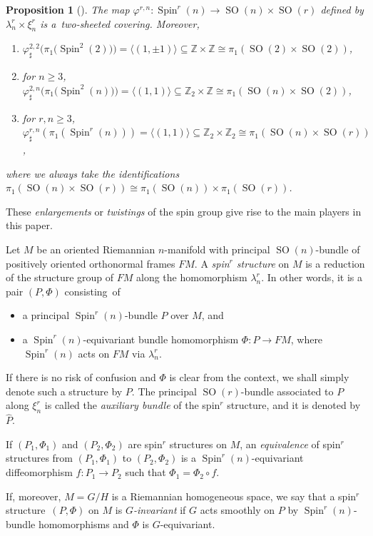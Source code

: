 \documentclass[pdftex]{sigma}
\numberwithin{equation}{section}
\newtheorem{Proposition}[Theorem]{Proposition}
{ \theoremstyle{definition}
	\newtheorem{Definition}[Theorem]{Definition}
	\newtheorem{Note}[Theorem]{Note}
	\newtheorem{Example}[Theorem]{Example}
	\newtheorem{Remark}[Theorem]{Remark} }
\DeclareMathOperator{\SO}{SO}
\DeclareMathOperator{\Spin}{Spin}
\begin{document}
		\begin{Proposition}[\cite{gen_spin_AL}]\label{prop:fg}
			The map $\varphi^{r,n} \colon \Spin^r(n) \to \SO(n) \times \SO(r)$ defined by $\lambda^{r}_n \times \xi^{r}_n$ is a~two-sheeted covering. Moreover,
			\begin{enumerate}\itemsep=0pt
				\item[$(1)$] $\varphi^{2,2}_{\sharp}\bigl(\pi_1\bigl( \Spin^2(2)\bigr) \bigr) = \langle(1,\pm 1)\rangle \subseteq \mathbb{Z} \times \mathbb{Z} \cong \pi_1 ( \SO(2) \times \SO(2))$,
				\item[$(2)$] for $n \geq 3$, $\varphi^{2,n}_{\sharp} \bigl( \pi_1 \bigl(\Spin^2(n)\bigr)\bigr) = \langle(1,1)\rangle \subseteq \mathbb{Z}_2 \times \mathbb{Z} \cong \pi_1 ( \SO(n) \times \SO(2))$,
				\item[$(3)$] for $r,n \geq 3$, $\varphi^{r,n}_{\sharp}(\pi_1 (\Spin^r(n) ) ) = \langle (1,1) \rangle \subseteq \mathbb{Z}_2 \times \mathbb{Z}_2 \cong \pi_1 ( \SO(n) \times \SO(r))$,
			\end{enumerate}
			where we always take the identifications $\pi_1 (\SO(n) \times \SO(r)) \cong \pi_1(\SO(n)) \times \pi_1(\SO(r))$.
		\end{Proposition}
		These \textit{enlargements} or \textit{twistings} of the spin group give rise to the main players in this paper.
		\begin{Definition}
			Let $M$ be an oriented Riemannian $n$-manifold with principal $\SO(n)$-bundle of positively oriented orthonormal frames $FM$. A \textit{spin$^r$ structure} on $M$ is a reduction of the structure group of $FM$ along the homomorphism $\lambda^r_n$. In other words, it is a pair $(P,\Phi)$ consisting~of
			\begin{itemize}\itemsep=0pt
				\item a principal $\Spin^r(n)$-bundle $P$ over $M$, and
				\item a $\Spin^r(n)$-equivariant bundle homomorphism $\Phi \colon P \to FM$, where $\Spin^r(n)$ acts on $FM$ via $\lambda^r_n$.
			\end{itemize}
			If there is no risk of confusion and $\Phi$ is clear from the context, we shall simply denote such a structure by $P$. The principal $\SO(r)$-bundle associated to $P$ along $\xi^r_n$ is called the \textit{auxiliary bundle} of the spin$^r$ structure, and it is denoted by $\hat{P}$.
			
			If $(P_1,\Phi_1)$ and $(P_2,\Phi_2)$ are spin$^r$ structures on $M$, an \textit{equivalence} of spin$^r$ structures from $(P_1,\Phi_1)$ to $(P_2,\Phi_2)$ is a $\Spin^r(n)$-equivariant diffeomorphism $f \colon P_1 \to P_2$ such that $\Phi_1 = \Phi_2 \circ f$.
			
			If, moreover, $M = G/H$ is a Riemannian homogeneous space, we say that a spin$^r$ structure~${(P,\Phi)}$ on $M$ is \textit{$G$-invariant} if $G$ acts smoothly on $P$ by $\Spin^r(n)$-bundle homomorphisms and $\Phi$ is $G$-equivariant.
		\end{Definition}
		
\end{document}
